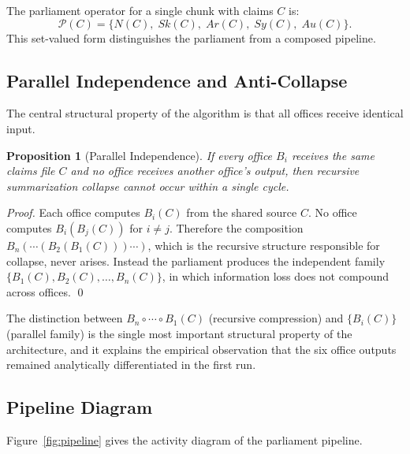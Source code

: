 \documentclass[12pt, a4paper]{article}
\newtheorem{proposition}{Proposition}[section]
\theoremstyle{principle}
\theoremstyle{definition}
\begin{document}
The parliament operator for a single chunk with claims $C$ is:
\[
\mathcal{P}(C) = \bigl\{N(C),\; Sk(C),\; Ar(C),\; Sy(C),\; Au(C)\bigr\}.
\]
This set-valued form distinguishes the parliament from a composed pipeline.

\subsection{Parallel Independence and Anti-Collapse}

The central structural property of the algorithm is that all offices receive
identical input.

\begin{proposition}[Parallel Independence]
\label{prop:independence}
If every office $B_i$ receives the same claims file $C$ and no office receives
another office's output, then recursive summarization collapse cannot occur within
a single cycle.
\end{proposition}

\begin{proof}
Each office computes $B_i(C)$ from the shared source $C$. No office computes
$B_i(B_j(C))$ for $i \neq j$. Therefore the composition
$B_n(\cdots(B_2(B_1(C)))\cdots)$, which is the recursive structure responsible
for collapse, never arises. Instead the parliament produces the independent family
$\{B_1(C), B_2(C), \ldots, B_n(C)\}$, in which information loss does not compound
across offices. \qed
\end{proof}

The distinction between $B_n \circ \cdots \circ B_1(C)$ (recursive compression)
and $\{B_i(C)\}$ (parallel family) is the single most important structural property
of the architecture, and it explains the empirical observation that the six office
outputs remained analytically differentiated in the first run.

\subsection{Pipeline Diagram}

Figure~\ref{fig:pipeline} gives the activity diagram of the parliament pipeline.
\end{document}
